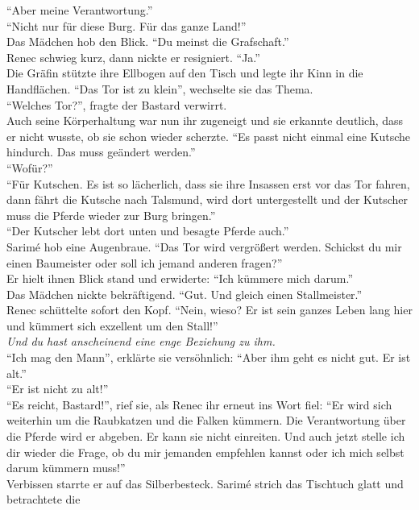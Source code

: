 ``Aber meine Verantwortung.''\\
``Nicht nur für diese Burg. Für das ganze Land!''\\
Das Mädchen hob den Blick. ``Du meinst die Grafschaft.''\\
Renec schwieg kurz, dann nickte er resigniert. ``Ja.''\\
Die Gräfin stützte ihre Ellbogen auf den Tisch und legte ihr Kinn in die Handflächen. ``Das Tor ist 
zu klein'', wechselte sie das Thema.\\
``Welches Tor?'', fragte der Bastard verwirrt.\\
Auch seine Körperhaltung war nun ihr zugeneigt und sie erkannte deutlich, dass er nicht wusste, ob 
sie schon wieder scherzte. ``Es passt nicht einmal eine Kutsche hindurch. Das muss geändert 
werden.''\\
``Wofür?''\\
``Für Kutschen. Es ist so lächerlich, dass sie ihre Insassen erst vor das Tor fahren, dann fährt 
die Kutsche nach Talsmund, wird dort untergestellt und der Kutscher muss die Pferde wieder zur Burg 
bringen.''\\
``Der Kutscher lebt dort unten und besagte Pferde auch.''\\
Sarimé hob eine Augenbraue. ``Das Tor wird vergrößert werden. Schickst du mir einen Baumeister oder 
soll ich jemand anderen fragen?''\\
Er hielt ihnen Blick stand und erwiderte: ``Ich kümmere mich darum.''\\
Das Mädchen nickte bekräftigend. ``Gut. Und gleich einen Stallmeister.''\\
Renec schüttelte sofort den Kopf. ``Nein, wieso? Er ist sein ganzes Leben lang hier und kümmert 
sich 
exzellent um den Stall!''\\
\textit{Und du hast anscheinend eine enge Beziehung zu ihm.}\\
``Ich mag den Mann'', erklärte sie versöhnlich: ``Aber ihm geht es nicht gut. Er ist alt.''\\
``Er ist nicht zu alt!''\\
``Es reicht, Bastard!'', rief sie, als Renec ihr erneut ins Wort fiel: ``Er wird sich weiterhin um 
die 
Raubkatzen und die Falken kümmern. Die Verantwortung über die Pferde wird er abgeben. Er kann sie 
nicht einreiten. Und auch jetzt stelle ich dir wieder die Frage, ob du mir jemanden empfehlen 
kannst 
oder ich mich selbst darum kümmern muss!''\\
Verbissen starrte er auf das Silberbesteck. Sarimé strich das Tischtuch glatt und betrachtete die 
